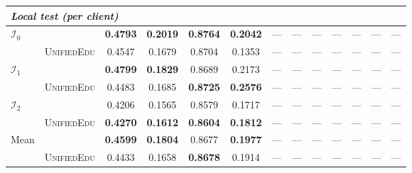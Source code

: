 \documentclass[11pt]{article}
\theoremstyle{plain}
\theoremstyle{definition}
\theoremstyle{remark}
\newcommand{\UniEdu}{\textsc{UnifiedEdu}}
\newcommand{\indiv}{\text{indiv}}
\begin{document}
\begin{table}[t]
\begin{tabular}{ll cccc ccccccc}
\midrule
\multicolumn{13}{l}{\textit{Local test (per client)}} \\
\midrule
\multirow{2}{*}{$\mathcal{I}_0$}
  & \indiv     & \textbf{0.4793} & \textbf{0.2019} & \textbf{0.8764} & \textbf{0.2042} & --- & --- & --- & --- & --- & --- & --- \\
  & \UniEdu{}  & 0.4547 & 0.1679 & 0.8704 & 0.1353 & --- & --- & --- & --- & --- & --- & --- \\
\multirow{2}{*}{$\mathcal{I}_1$}
  & \indiv     & \textbf{0.4799} & \textbf{0.1829} & 0.8689 & 0.2173 & --- & --- & --- & --- & --- & --- & --- \\
  & \UniEdu{}  & 0.4483 & 0.1685 & \textbf{0.8725} & \textbf{0.2576} & --- & --- & --- & --- & --- & --- & --- \\
\multirow{2}{*}{$\mathcal{I}_2$}
  & \indiv     & 0.4206 & 0.1565 & 0.8579 & 0.1717 & --- & --- & --- & --- & --- & --- & --- \\
  & \UniEdu{}  & \textbf{0.4270} & \textbf{0.1612} & \textbf{0.8604} & \textbf{0.1812} & --- & --- & --- & --- & --- & --- & --- \\
\multirow{2}{*}{Mean}
  & \indiv     & \textbf{0.4599} & \textbf{0.1804} & 0.8677 & \textbf{0.1977} & --- & --- & --- & --- & --- & --- & --- \\
  & \UniEdu{}  & 0.4433 & 0.1658 & \textbf{0.8678} & 0.1914 & --- & --- & --- & --- & --- & --- & --- \\
\bottomrule
\end{tabular}
\end{table}
\end{document}
